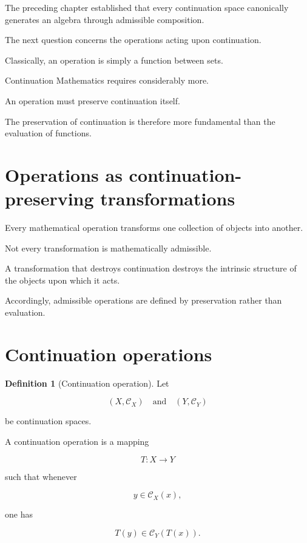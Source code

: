 \documentclass[13pt,openany]{book}
\theoremstyle{plain}
\theoremstyle{definition}
\newtheorem{definition}{Definition}[chapter]
\begin{document}
The preceding chapter established that every continuation space canonically
generates an algebra through admissible composition.

The next question concerns the operations acting upon continuation.

Classically, an operation is simply a function between sets.

Continuation Mathematics requires considerably more.

An operation must preserve continuation itself.

The preservation of continuation is therefore more fundamental than the
evaluation of functions.

\section{Operations as continuation-preserving transformations}

Every mathematical operation transforms one collection of objects into another.

Not every transformation is mathematically admissible.

A transformation that destroys continuation destroys the intrinsic structure of
the objects upon which it acts.

Accordingly, admissible operations are defined by preservation rather than
evaluation.

\section{Continuation operations}

\begin{definition}[Continuation operation]
Let

\[
(X,\mathcal C_X)
\quad\text{and}\quad
(Y,\mathcal C_Y)
\]

be continuation spaces.

A continuation operation is a mapping

\[
T:X\longrightarrow Y
\]

such that whenever

\[
y\in\mathcal C_X(x),
\]

one has

\[
T(y)\in\mathcal C_Y(T(x)).
\]

\end{definition}
\end{document}
